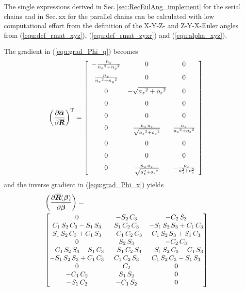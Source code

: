 \documentclass[twocolumn,10pt]{IFTOMM}
\newcommand{\bm}[1]{\boldsymbol{#1}}
\newcommand{\transp}[0]{{\mathrm{T}}}
\begin{document}
The single expressions derived in Sec.\,\ref{sec:RecEulAng_implement} for the serial chains and in Sec.\,xx for the parallel chains can be calculated with low computational effort from the definition of the X-Y-Z- and Z-Y-X-Euler angles from (\ref{equ:def_rmat_xyz}), (\ref{equ:def_rmat_zyxr}) and (\ref{equ:alpha_xyz}).

The gradient in (\ref{equ:grad_Phi_q}) becomes
%
\begin{equation}
\left(\frac{\partial \overline{\bm{\alpha}}}{\partial \overline{\bm{R}}}\right)^\transp
=
 \left[ \begin {array}{ccc} -{\frac {{n_y}}{{{n_x}}^{2}+{{n_y }}^{2}}}&0&0\\ \noalign{\medskip}{\frac {{n_x}}{{{n_x}}^{2}+{{ n_y}}^{2}}}&0&0\\ \noalign{\medskip}0&-\sqrt {{{a_z}}^{2}+{{ o_z}}^{2}}&0\\ \noalign{\medskip}0&0&0\\ \noalign{\medskip}0&0&0 \\ \noalign{\medskip}0&{\frac {{n_z}\,{o_z}}{\sqrt {{{a_z}}^{ 2}+{{o_z}}^{2}}}}&{\frac {{a_z}}{{{a_z}}^{2}+{{o_z}}^{2}}} \\ \noalign{\medskip}0&0&0\\ \noalign{\medskip}0&0&0 \\ \noalign{\medskip}0&{\frac {{n_z}\,{a_z}}{\sqrt {a_z^{2}+{{o_z}}^{2}}}}&-{\frac {o_z}{a_z^{2}+o_z^{2}} }\end {array} \right] 
\end{equation}
%
and the inverse gradient in (\ref{equ:grad_Phi_x}) yields
%
\begin{align}
&\left(\frac{\partial \overline{\bm{R}}(\bm{\beta})}{\partial \overline{\bm{\beta}}}\right)
=\\
\small
&\begin{bmatrix}
0&-{ S_2}\,{ C_3}&-{ C_2}\,{ S_3}
\\ { C_1}\,{ S_2}\,{ C_3}-{ S_1}\,{ S_3}&{
    S_1}\,{ C_2}\,{ C_3}&-{ S_1}\,{ S_2}\,{ S_3}+{ C_1}\,{
    C_3}\\ { S_1}\,{ S_2}\,{ C_3}+{ C_1}\,{
    S_3}&-{ C_1}\,{ C_2}\,{ C_3}&{ C_1}\,{ S_2}\,{ S_3}+{
    S_1}\,{ C_3}\\ 0&{ S_2}\,{ S_3}&-{ C_2}\,
{ C_3}\\ -{ C_1}\,{ S_2}\,{ S_3}-{ S_1}\,{
    C_3}&-{ S_1}\,{ C_2}\,{ S_3}&-{ S_1}\,{ S_2}\,{ C_3}-{
    C_1}\,{ S_3}\\ -{ S_1}\,{ S_2}\,{ S_3}+{
    C_1}\,{ C_3}&{ C_1}\,{ C_2}\,{ S_3}&{ C_1}\,{ S_2}\,{
    C_3}-{ S_1}\,{ S_3}\\ 0&{ C_2}&0
\\ -{ C_1}\,{ C_2}&{ S_1}\,{ S_2}&0
\\ -{ S_1}\,{ C_2}&-{ C_1}\,{ S_2}&0
\end {bmatrix}  \nonumber
\end{align}
\end{document}
